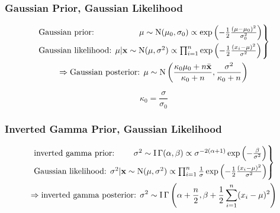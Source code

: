 \documentclass[12pt, twoside, draft]{article}
\begin{document}
\subsubsection{Gaussian Prior, Gaussian Likelihood}\label{sec:conjugate_family_Gaussian_Gaussian}
\begin{multline}
\begin{rcases}
\text{Gaussian prior: } \hspace{50pt}   \mu \sim \operatorname{N}(\mu_0, \sigma_0) \propto \exp \left(-\frac{1}{2} \frac{(\mu - \mu_0)^2}{\sigma_0^2} \right) \\
\text{Gaussian likelihood: } \mu | \mathbf{x} \sim \operatorname{N}(\mu, \sigma^2) \propto \prod_{i=1}^n \exp \left( -\frac{1}{2} \frac{(x_i - \mu)^2}{\sigma^2} \right)
\end{rcases} \\ \Rightarrow
\text{Gaussian posterior: } \mu \sim \operatorname{N}\left( \frac{\kappa_0 \mu_0 + n\bar{\mathbf{x}}}{\kappa_0 + n}, \frac{\sigma^2}{\kappa_0 + n} \right)
\end{multline}

\begin{equation}
\kappa_0 = \frac{\sigma}{\sigma_0}
\end{equation}

\subsubsection{Inverted Gamma Prior, Gaussian Likelihood}\label{sec:conjugate_family_inverted_gamma_Poisson}
\begin{multline}
\begin{rcases}
\text{inverted gamma prior: } \hspace{19pt}   \sigma^2 \sim \operatorname{I}\Gamma(\alpha, \beta) \propto \sigma^{-2(\alpha + 1)}\exp \left( -\frac{\beta}{\sigma^2} \right) \\
\text{Gaussian likelihood: } \sigma^2 | \mathbf{x} \sim \operatorname{N}(\mu, \sigma^2) \propto \prod_{i=1}^n \frac{1}{\sigma}\exp \left( -\frac{1}{2} \frac{(x_i - \mu)^2}{\sigma^2} \right)
\end{rcases} \\ \Rightarrow
\text{inverted gamma posterior: } \sigma^2 \sim \operatorname{I}\Gamma \left( \alpha + \frac{n}{2}, \beta + \frac{1}{2} \sum_{i=1}^n (x_i - \mu)^2 \right)
\end{multline}
\end{document}
